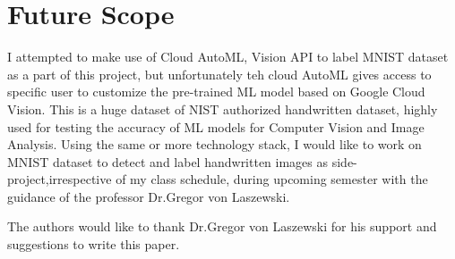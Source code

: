 \section{Future Scope}

I attempted to make use of Cloud AutoML, Vision API to label MNIST
dataset as a part of this project, but unfortunately teh cloud AutoML
gives access to specific user to customize the pre-trained ML model
based on Google Cloud Vision. This is a huge dataset of NIST
authorized handwritten dataset, highly used for testing the accuracy
of ML models for Computer Vision and Image Analysis. Using the same or
more technology stack, I would like to work on MNIST dataset to detect
and label handwritten images as side-project,irrespective of my class
schedule, during upcoming semester with the guidance of the professor
Dr.Gregor von Laszewski.

\begin{acks}

  The authors would like to thank Dr.Gregor von Laszewski for his
  support and suggestions to write this paper.
  
\end{acks}




